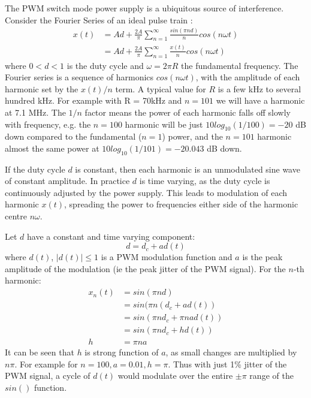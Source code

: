 \documentclass{article}
\begin{document}
The PWM switch mode power supply is a ubiquitous source of interference.  Consider the Fourier Series of an ideal pulse train \cite{wikipedia_pulse}:
\begin{equation} \label{eq_pwm}
\begin{split}
x(t) &= Ad+\frac{2A}{\pi} \sum_{n=1}^{\infty} \frac{sin(\pi n d)}{n}cos(n \omega t) \\
     &= Ad+\frac{2A}{\pi} \sum_{n=1}^{\infty} \frac{x(t)}{n} cos(n \omega t)
\end{split}
\end{equation}
where $0<d<1$ is the duty cycle and $\omega=2 \pi R$ the fundamental frequency.  The Fourier series is a sequence of harmonics $cos(n \omega t)$, with the amplitude of each harmonic set by the $x(t)/n$ term. A typical value for $R$ is a few kHz to several hundred kHz. For example with R = 70kHz and $n=101$ we will have a harmonic at 7.1 MHz. The $1/n$ factor means the power of each harmonic falls off slowly with frequency, e.g. the $n=100$ harmonic will be just $10log_{10}(1/100)=-20$ dB down compared to the fundamental ($n=1$) power, and the $n=101$ harmonic almost the same power at $10log_{10}(1/101)=-20.043$ dB down.

If the duty cycle $d$ is constant, then each harmonic is an unmodulated sine wave of constant amplitude. In practice $d$ is time varying, as the duty cycle is continuously adjusted by the power supply.  This leads to modulation of each harmonic $x(t)$, spreading the power to frequencies either side of the harmonic centre $n \omega$.

Let $d$ have a constant and time varying component:
\begin{equation}
d=d_c+ad(t)
\end{equation}
where $d(t)$, $|d(t)| \le 1$ is a PWM modulation function and $a$ is the peak amplitude of the modulation (ie the peak jitter of the PWM signal). For the $n$-th harmonic:
\begin{equation} \label{eq:pwm_n}
\begin{split}
x_n(t) &= sin(\pi n d) \\
       &= sin(\pi n (d_c+ad(t)) \\
       &= sin(\pi n d_c + \pi n a d(t)) \\
       &= sin(\pi n d_c + h d(t))  \\
     h &= \pi n a
\end{split}
\end{equation}
It can be seen that $h$ is strong function of $a$, as small changes are multiplied by $n \pi$. For example for $n=100, a=0.01, h = \pi$.  Thus with just 1\% jitter of the PWM signal, a cycle of $d(t)$ would modulate over the entire $\pm \pi$ range of the $sin()$ function.
\end{document}
